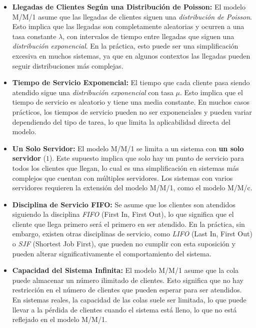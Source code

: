 \documentclass{article}
\begin{document}
\begin{itemize}
    \item \textbf{Llegadas de Clientes Según una Distribución de Poisson:} 
    El modelo M/M/1 asume que las llegadas de clientes siguen una \textit{distribución de Poisson}. Esto implica que las llegadas son completamente aleatorias y ocurren a una tasa constante \( \lambda \), con intervalos de tiempo entre llegadas que siguen una \textit{distribución exponencial}. En la práctica, esto puede ser una simplificación excesiva en muchos sistemas, ya que en algunos contextos las llegadas pueden seguir distribuciones más complejas.
    
    \item \textbf{Tiempo de Servicio Exponencial:} 
    El tiempo que cada cliente pasa siendo atendido sigue una \textit{distribución exponencial} con tasa \( \mu \). Esto implica que el tiempo de servicio es aleatorio y tiene una media constante. En muchos casos prácticos, los tiempos de servicio pueden no ser exponenciales y pueden variar dependiendo del tipo de tarea, lo que limita la aplicabilidad directa del modelo.
    
    \item \textbf{Un Solo Servidor:} 
    El modelo M/M/1 se limita a un sistema con \textbf{un solo servidor} (\(1\)). Este supuesto implica que solo hay un punto de servicio para todos los clientes que llegan, lo cual es una simplificación en sistemas más complejos que cuentan con múltiples servidores. Los sistemas con varios servidores requieren la extensión del modelo M/M/1, como el modelo M/M/c.
    
    \item \textbf{Disciplina de Servicio FIFO:} 
    Se asume que los clientes son atendidos siguiendo la disciplina \textit{FIFO} (First In, First Out), lo que significa que el cliente que llega primero será el primero en ser atendido. En la práctica, sin embargo, existen otras disciplinas de servicio, como \textit{LIFO} (Last In, First Out) o \textit{SJF} (Shortest Job First), que pueden no cumplir con esta suposición y pueden alterar significativamente el comportamiento del sistema.
    
    \item \textbf{Capacidad del Sistema Infinita:} 
    El modelo M/M/1 asume que la cola puede almacenar un número ilimitado de clientes. Esto significa que no hay restricción en el número de clientes que pueden esperar para ser atendidos. En sistemas reales, la capacidad de las colas suele ser limitada, lo que puede llevar a la pérdida de clientes cuando el sistema está lleno, lo que no está reflejado en el modelo M/M/1.
    

\end{itemize}
\end{document}
